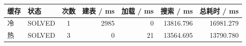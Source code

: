 \begin{tabular}{llcrrrr}
\toprule
\textbf{缓存} & \textbf{状态} & \textbf{次数} & \textbf{建表 / ms} & \textbf{加载 / ms} & \textbf{搜索 / ms} & \textbf{总耗时 / ms} \\
\midrule
冷 & SOLVED & 1 & 2985 & 0 & 13816.796 & 16981.279 \\
热 & SOLVED & 3 & 0 & 21 & 13564.695 & 13790.780 \\
\bottomrule
\end{tabular}

